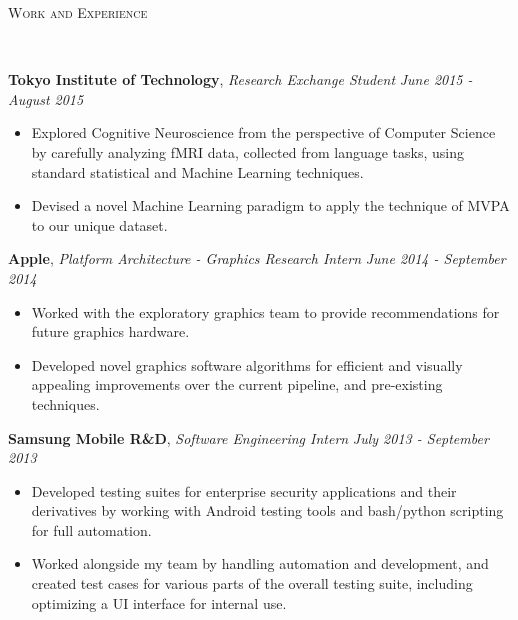 \documentclass[9pt]{article}
\newenvironment{changemargin}[2]{%
  \begin{list}{}{%
    \setlength{\topsep}{0pt}%
    \setlength{\leftmargin}{#1}%
    \setlength{\rightmargin}{#2}%
    \setlength{\listparindent}{\parindent}%
    \setlength{\itemindent}{\parindent}%
    \setlength{\parsep}{\parskip}%
  }%
  \item[]}{\end{list}
}
\newcommand{\lineover}{
	\begin{changemargin}{-0.05in}{-0.05in}
		\vspace*{-8pt}
		\hrulefill \\
		\vspace*{-2pt}
	\end{changemargin}
}
\newcommand{\header}[1]{
	\begin{changemargin}{-0.5in}{-0.5in}
		\scshape{#1}\\
  	\lineover
	\end{changemargin}
}
\newenvironment{body} {
	\vspace*{-16pt}
	\begin{changemargin}{-0.25in}{-0.5in}
  }	
	{\end{changemargin}
}
\begin{document}
\header{Work and Experience}
\begin{body}
	\vspace{16pt}
	\textbf{Tokyo Institute of Technology}, \emph{Research Exchange Student} \hfill \emph{June 2015 - August 2015}\\
	\vspace*{-3pt}
	\begin{itemize} \itemsep -0pt %
	\item Explored Cognitive Neuroscience from the perspective of Computer Science by carefully analyzing fMRI data, collected from language tasks, using standard statistical and Machine Learning techniques.
	\item Devised a novel Machine Learning paradigm to apply the technique of MVPA to our unique dataset.
	\end{itemize}
	\vspace*{-1pt}
	\textbf{Apple}, \emph{Platform Architecture - Graphics Research Intern} \hfill \emph{June 2014 - September 2014}\\
	\vspace*{-3pt}
	\begin{itemize} \itemsep -0pt %
	\item Worked with the exploratory graphics team to provide recommendations for future graphics hardware.
	\item Developed novel graphics software algorithms for efficient and visually appealing improvements over the current pipeline, and pre-existing techniques.
	\end{itemize}
	\vspace*{-1pt}
	\textbf{Samsung Mobile R\&D}, \emph{Software Engineering Intern} \hfill \emph{July 2013 - September 2013}\\
	\vspace*{-3pt}
	\begin{itemize} \itemsep -0pt %
	\item Developed testing suites for enterprise security applications and their derivatives by working with Android testing tools and bash/python scripting for full automation.
	\item Worked alongside my team by handling automation and development, and created test cases for various parts of the overall testing suite, including optimizing a UI interface for internal use.

\end{itemize}
\end{body}
\end{document}
